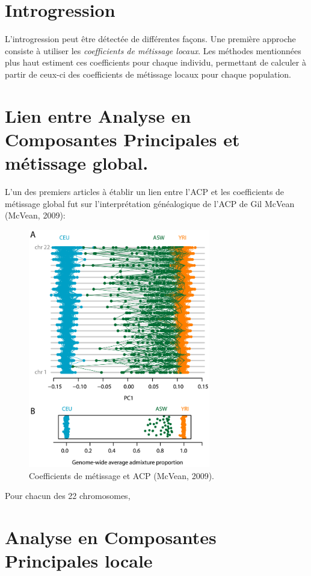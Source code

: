 \documentclass[12pt,a4paper,twoside]{ugathesis}
\theoremstyle{definition}
\theoremstyle{definition}
\theoremstyle{remark}
\begin{document}
\section{Introgression}\label{introgression}

L'introgression peut être détectée de différentes façons. Une première
approche consiste à utiliser les \emph{coefficients de métissage
locaux}. Les méthodes mentionnées plus haut estiment ces coefficients
pour chaque individu, permettant de calculer à partir de ceux-ci des
coefficients de métissage locaux pour chaque population.

\section{Lien entre Analyse en Composantes Principales et métissage
global.}\label{lien-entre-analyse-en-composantes-principales-et-metissage-global.}

L'un des premiers articles à établir un lien entre l'ACP et les
coefficients de métissage global fut sur l'interprétation généalogique
de l'ACP de Gil McVean (McVean, 2009):


\begin{figure}

{\centering \includegraphics[width=300px]{figure/mcvean} 

}

\caption{Coefficients de métissage et ACP (McVean, 2009).}\label{fig:mcvean}
\end{figure}
Pour chacun des 22 chromosomes,

\section{Analyse en Composantes Principales
locale}\label{analyse-en-composantes-principales-locale}
\end{document}
